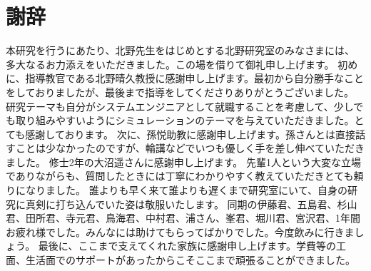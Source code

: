 \chapter*{謝辞}
本研究を行うにあたり、北野先生をはじめとする北野研究室のみなさまには、
多大なるお力添えをいただきました。この場を借りて御礼申し上げます。
初めに、指導教官である北野晴久教授に感謝申し上げます。最初から自分勝手なことをしておりましたが、最後まで指導をしてくださりありがとうございました。
研究テーマも自分がシステムエンジニアとして就職することを考慮して、少しでも取り組みやすいようにシミュレーションのテーマを与えていただきました。とても感謝しております。
次に、孫悦助教に感謝申し上げます。孫さんとは直接話すことは少なかったのですが、輪講などでいつも優しく手を差し伸べていただきました。
修士2年の大沼遥さんに感謝申し上げます。
先輩1人という大変な立場でありながらも、質問したときには丁寧にわかりやすく教えていただきとても頼りになりました。
誰よりも早く来て誰よりも遅くまで研究室にいて、自身の研究に真剣に打ち込んでいた姿は敬服いたします。
同期の伊藤君、五島君、杉山君、田所君、寺元君、鳥海君、中村君、浦さん、峯君、堀川君、宮沢君、1年間お疲れ様でした。みんなには助けてもらってばかりでした。今度飲みに行きましょう。
最後に、ここまで支えてくれた家族に感謝申し上げます。学費等の工面、生活面でのサポートがあったからこそここまで頑張ることができました。
